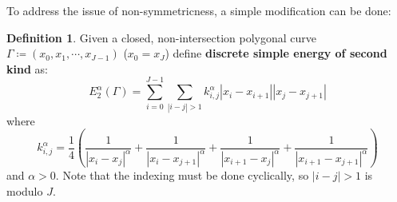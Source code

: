 \documentclass[a4paper]{article}
\theoremstyle{definition}
\newtheorem{definition}{Definition}
\begin{document}
To address the issue of non-symmetricness, a simple modification can be done:
\begin{definition}
    Given a closed, non-intersection polygonal curve $\Gamma \coloneqq \left( x_0, x_1, \cdots, x_{J-1} \right)$
    ($x_0 = x_J$)
    define \textbf{discrete simple energy of second kind} as:
    \begin{equation}
        E_{2}^{\alpha}\left( \Gamma \right) = \sum_{i=0}^{J-1} \sum_{|i - j| > 1} k_{i,j}^{\alpha} |x_i - x_{i+1}| |x_j - x_{j+1}|
    \end{equation}
    where
    \begin{equation}
        k_{i,j}^{\alpha} = \frac{1}{4} \left( \frac{1}{|x_i - x_j|^{\alpha}} + \frac{1}{|x_{i} - x_{j+1}|^{\alpha}} + \frac{1}{|x_{i+1} - x_{j}|^{\alpha}} + \frac{1}{|x_{i+1} - x_{j+1}|^{\alpha}} \right)
    \end{equation}
    and $\alpha > 0$.
    Note that the indexing must be done cyclically, so $|i-j| > 1$ is modulo $J$.
\end{definition}
\end{document}
